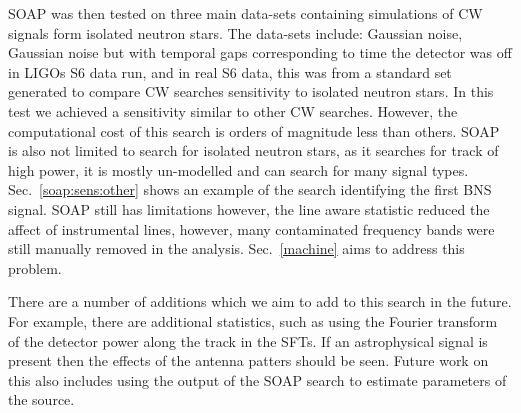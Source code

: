 SOAP was then tested on three main data-sets containing simulations of \gls{CW} signals form isolated neutron stars.
The data-sets include: Gaussian noise, Gaussian noise but with temporal gaps corresponding to time the detector was off in \glspl{LIGO} S6 data run, and in real S6 data, this was from a standard set generated to compare \gls{CW} searches sensitivity to isolated neutron stars.
In this test we achieved a sensitivity similar to other \gls{CW} searches. 
However, the computational cost of this search is orders of magnitude less than others. 
SOAP is also not limited to search for isolated neutron stars, as it searches for track of high power, it is mostly un-modelled and can search for many signal types.
Sec.~\ref{soap:sens:other} shows an example of the search identifying the first \gls{BNS} signal. 
SOAP still has limitations however, the line aware statistic reduced the affect of instrumental lines, however, many contaminated frequency bands were still manually removed in the analysis.
Sec.~\ref{machine} aims to address this problem.

There are a number of additions which we aim to add to this search in the future. 
For example, there are additional statistics, such as using the Fourier transform of the detector power along the track in the \glspl{SFT}. 
If an astrophysical signal is present then the effects of the antenna patters should be seen.
Future work on this also includes using the output of the SOAP search to estimate parameters of the source. 

\bigskip


